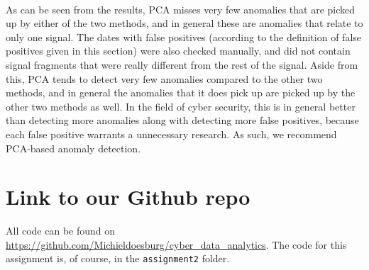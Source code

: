 \documentclass[]{article}
\begin{document}
\\
As can be seen from the results, PCA misses very few anomalies that are picked up by either of the two methods, and in general these are anomalies that relate to only one signal. The dates with false positives (according to the definition of false positives given in this section) were also checked manually, and did not contain signal fragments that were really different from the rest of the signal. Aside from this, PCA tends to detect very few anomalies compared to the other two methods, and in general the anomalies that it does pick up are picked up by the other two methods as well. In the field of cyber security, this is in general better than detecting more anomalies along with detecting more false positives, because each false positive warrants a unnecessary research. As such, we recommend PCA-based anomaly detection.
\section{Link to our Github repo}
All code can be found on \url{https://github.com/Michieldoesburg/cyber_data_analytics}. The code for this assignment is, of course, in the \texttt{assignment2} folder.


\end{document}
